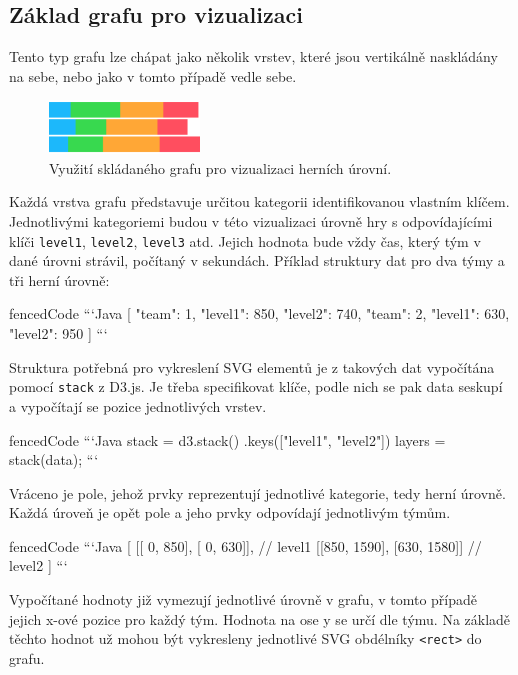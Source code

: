 \documentclass[
  digital, %
  oneside, %
  table,   %
  nolof,     %
  nolot,     %
]{fithesis3}
\begin{document}
\subsection{Základ grafu pro vizualizaci} \label{chartBase}
Tento typ grafu lze chápat jako několik vrstev, které jsou vertikálně naskládány na sebe, nebo jako v tomto případě vedle sebe.
\begin{figure}[H]
  \begin{center}
    \includegraphics[width=4cm]{images/stack-ctf.pdf}
  \end{center}
  \caption{Využití skládaného grafu pro vizualizaci herních úrovní.}
  \label{fig:visualizationChart}
\end{figure}
Každá vrstva grafu představuje určitou kategorii identifikovanou vlastním klíčem. Jednotlivými kategoriemi budou v této vizualizaci úrovně hry s odpovídajícími klíči \verb|level1|, \verb|level2|, \verb|level3| atd. Jejich hodnota bude vždy čas, který tým v dané úrovni strávil, počítaný v sekundách. Příklad struktury dat pro dva týmy a tři herní úrovně:
\begin{markdown*}{
  fencedCode
}
```Java
[
  {"team": 1, "level1": 850, "level2": 740},
  {"team": 2, "level1": 630, "level2": 950}
]
```
\end{markdown*}

Struktura potřebná pro vykreslení SVG elementů je z takových dat vypočítána pomocí \verb|stack| z D3.js. Je třeba specifikovat klíče, podle nich se pak data seskupí a vypočítají se pozice jednotlivých vrstev.

\begin{markdown*}{
  fencedCode
}
```Java
stack = d3.stack()
		  .keys(["level1", "level2"])
layers = stack(data);
```
\end{markdown*}
Vráceno je pole, jehož prvky reprezentují jednotlivé kategorie, tedy herní úrovně. Každá úroveň je opět pole a jeho prvky odpovídají jednotlivým týmům.
\begin{markdown*}{
  fencedCode
}
```Java
[
  [[  0, 850], [  0, 630]],     // level1
  [[850, 1590], [630, 1580]]    // level2
]
```
\end{markdown*}
Vypočítané hodnoty již vymezují jednotlivé úrovně v grafu, v tomto případě jejich \mbox{x-ové} pozice pro každý tým. Hodnota na ose y se určí dle týmu. Na základě těchto hodnot už mohou být vykresleny jednotlivé SVG obdélníky \verb|<rect>| do grafu.
\end{document}
